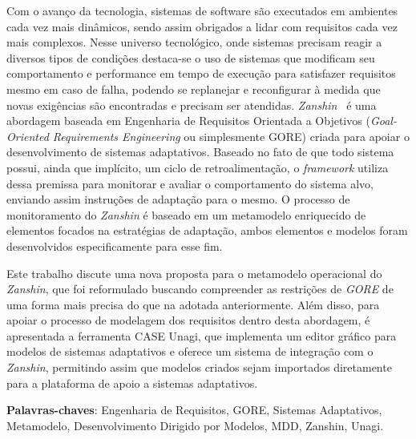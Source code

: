 \documentclass[
	12pt,				%
	openright,			%
	oneside,
	a4paper,			%
	english,			%
	french,				%
	spanish,			%
	brazil				%
	]{abntex2}
\newcommand{\vitor}[1]{\todo[author=\textbf{Vítor},color=red!30,caption={},inline]{#1}}
\newcommand{\awreqs}{\textit{AwReqs}\xspace}
\newcommand{\evoreqs}{\textit{EvoReqs}\xspace}
\newcommand{\gore}{\textit{GORE}\xspace}
\newcommand{\zanshin}{\textit{Zanshin}\xspace}
\newcommand{\framework}{\textit{framework}\xspace}
\begin{document}
\setlength{\absparsep}{18pt}
\begin{resumo}

Com o avanço da tecnologia, sistemas de software são executados em ambientes cada vez mais dinâmicos, sendo assim obrigados a lidar com requisitos cada vez mais complexos. Nesse universo tecnológico, onde sistemas precisam reagir a diversos tipos de condições destaca-se o uso de sistemas que modificam seu comportamento e performance em tempo de execução para satisfazer requisitos mesmo em caso de falha, podendo se replanejar e reconfigurar à medida que novas exigências são encontradas e precisam ser atendidas.
\zanshin~\cite{tesevitor} é uma abordagem baseada em Engenharia de Requisitos Orientada a Objetivos (\textit{Goal-Oriented Requirements Engineering} ou simplesmente GORE) criada para apoiar o desenvolvimento de sistemas adaptativos. Baseado no fato de que todo sistema possui, ainda que implícito, um ciclo de retroalimentação, o \framework utiliza dessa premissa para monitorar e avaliar o comportamento do sistema alvo, enviando assim instruções de adaptação para o mesmo. O processo de monitoramento do \zanshin é baseado em um metamodelo enriquecido de elementos focados na estratégias de adaptação, ambos elementos e modelos foram desenvolvidos especificamente para esse fim.

Este trabalho discute uma nova proposta para o metamodelo operacional do \zanshin, que foi reformulado buscando compreender as restrições de \gore de uma forma mais precisa do que na adotada anteriormente.
Além disso, para apoiar o processo de modelagem dos requisitos dentro desta abordagem, é apresentada a ferramenta CASE Unagi, que implementa um editor gráfico para modelos de sistemas adaptativos e oferece um sistema de integração com o \zanshin, permitindo assim que modelos criados sejam importados diretamente para a plataforma de apoio a sistemas adaptativos.



\textbf{Palavras-chaves}: Engenharia de Requisitos, GORE, Sistemas Adaptativos, Metamodelo, Desenvolvimento Dirigido por Modelos, MDD, Zanshin, Unagi.
\end{resumo}
\end{document}
